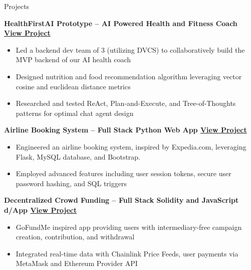 \documentclass{resume} %
\begin{document}

\begin{rSection}{Projects}

	\textbf{HealthFirstAI Prototype – AI Powered Health and Fitness Coach \href{https://youtu.be/FFocBeiQ8dE}{View Project}}
	\begin{itemize}
		\item Led a backend dev team of 3 (utilizing DVCS) to collaboratively build the MVP backend of our AI health coach
		\item Designed nutrition and food recommendation algorithm leveraging vector cosine and euclidean distance metrics
		\item Researched and tested ReAct, Plan-and-Execute, and Tree-of-Thoughts patterns for optimal chat agent design
	\end{itemize}

	\textbf{Airline Booking System – Full Stack Python Web App \href{https://github.com/larry-lime/airline-ticket-system}{View Project}}
	\begin{itemize}
		\item Engineered an airline booking system, inspired by Expedia.com, leveraging Flask, MySQL database, and Bootstrap.
		\item Employed advanced features including user session tokens, secure user password hashing, and SQL triggers
	\end{itemize}

	\textbf{Decentralized Crowd Funding – Full Stack Solidity and JavaScript d/App \href{https://github.com/larry-lime/fund-me-backend}{View Project}}
	\begin{itemize}
		\item GoFundMe inspired app providing users with intermediary-free campaign creation, contribution, and withdrawal
		\item Integrated real-time data with Chainlink Price Feeds, user payments via MetaMask and Ethereum Provider API
	\end{itemize}

\end{rSection}

\end{document}
